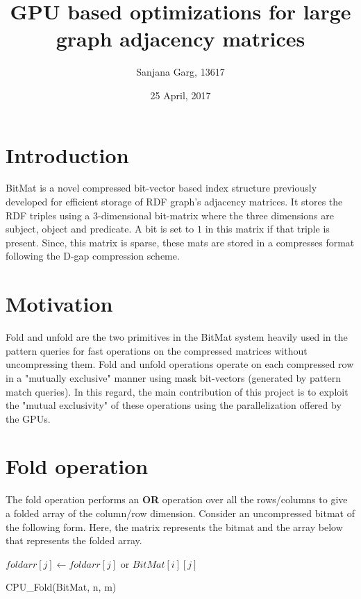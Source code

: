 \documentclass{article}
\title{GPU based optimizations for large graph adjacency matrices}
\author{Sanjana Garg, 13617}
\date{25 April, 2017}
\begin{document}
\maketitle

\section*{Introduction}
BitMat is a novel compressed bit-vector based index structure previously developed for efficient storage of RDF graph's adjacency matrices. It stores the RDF triples using a 3-dimensional bit-matrix where the three dimensions are subject, object and predicate. A bit is set to $1$ in this matrix if that triple is present. Since, this matrix is sparse, these mats are stored in a compresses format following the D-gap compression scheme.\\

\section*{Motivation}
Fold and unfold are the two primitives in the BitMat system heavily used in the pattern queries for fast operations on the compressed matrices without uncompressing them. Fold and unfold operations operate on each compressed row in a "mutually exclusive" manner using mask bit-vectors (generated by pattern match queries). In this regard, the main contribution of this project is to exploit the "mutual exclusivity" of these operations using the parallelization offered by the GPUs. 

\section*{Fold operation}
The fold operation performs an \textbf{OR} operation over all the rows/columns to give a folded array of the column/row dimension.
Consider an uncompressed bitmat of the following form. Here, the matrix represents the bitmat and the array below that represents the folded array.

\begin{algorithm}[H]
      \begin{algorithmic}[1]
                \STATE $foldarr[j] \gets foldarr[j]$ or $BitMat[i][j]$
            \ENDFOR
        \ENDFOR
      \end{algorithmic}
      \caption{CPU\_Fold(BitMat, n, m)}
\end{algorithm}
\end{document}
